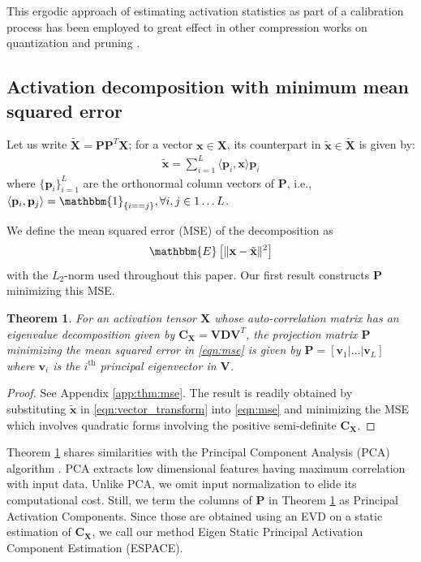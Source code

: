\documentclass{article}
\theoremstyle{plain}
\newtheorem{theorem}{Theorem}
\begin{document}
This ergodic approach of estimating activation statistics as part of a calibration process has been employed to great effect in other compression works on quantization \cite{sakr2022octav,wu2020integer} and pruning \cite{dai2023efficient}.


\subsection{Activation decomposition with minimum mean squared error}\label{sec:mse}
Let us write $\tilde{\mathbf{X}} = \mathbf{P} \mathbf{P}^T \mathbf{X}$; for a vector $\mathbf{x}\in \mathbf{X}$, its counterpart in $\tilde{\mathbf{x}}\in\tilde{\mathbf{X}}$ is given by: 
\begin{align}
    \label{eqn:vector_transform}
    \tilde{\mathbf{x}}=\sum_{i=1}^L\langle\mathbf{p}_i,\mathbf{x}\rangle\mathbf{p}_i
\end{align}
where $\{\mathbf{p}_i\}_{i=1}^L$ are the orthonormal column vectors of $\mathbf{P}$, i.e., $\langle\mathbf{p}_i,\mathbf{p}_j\rangle=\mathbbm{1}_{\{i==j\}},  \forall i,j \in 1\ldots L $.

We define the mean squared error (MSE) of the decomposition as 
 \begin{align}
     \label{eqn:mse}
     \mathbbm{E}\left[\lVert\mathbf{x}-\tilde{\mathbf{x}}\rVert^2\right]
 \end{align} 
with the $L_2$-norm used throughout this paper. Our first result constructs $\mathbf{P}$ minimizing this MSE.
\begin{theorem}
    \label{thm:mse}
    For an activation tensor $\mathbf{X}$ whose auto-correlation matrix has an eigenvalue decomposition given by $\mathbf{C}_{\mathbf{X}} = \mathbf{V}\mathbf{D}\mathbf{V}^T$, the projection matrix $\mathbf{P}$ minimizing the mean squared error in  \eqref{eqn:mse} is given by $\mathbf{P} = \left[\mathbf{v}_1 | \ldots | \mathbf{v}_L  \right]$ where $\mathbf{v}_i$ is the $i^\text{th}$ principal eigenvector in $\mathbf{V}$.
\end{theorem}

\begin{proof}
See Appendix \ref{app:thm:mse}. The result is readily obtained by substituting $\tilde{\mathbf{x}}$ in \eqref{eqn:vector_transform} into \eqref{eqn:mse} and minimizing the MSE which involves quadratic forms involving the positive semi-definite $\mathbf{C}_{\mathbf{X}}$.
\end{proof}
Theorem \ref{thm:mse} shares similarities with the Principal Component Analysis (PCA) algorithm \cite{abdi2010pca}. PCA extracts low dimensional features having maximum correlation with input data. Unlike PCA, we omit input normalization to elide its computational cost. Still, we term the columns of $\mathbf{P}$ in Theorem \ref{thm:mse} as Principal Activation Components. Since those are obtained using an EVD on a static estimation of $\mathbf{C}_{\mathbf{X}}$, we call our method Eigen Static Principal Activation Component Estimation (ESPACE).
\end{document}
